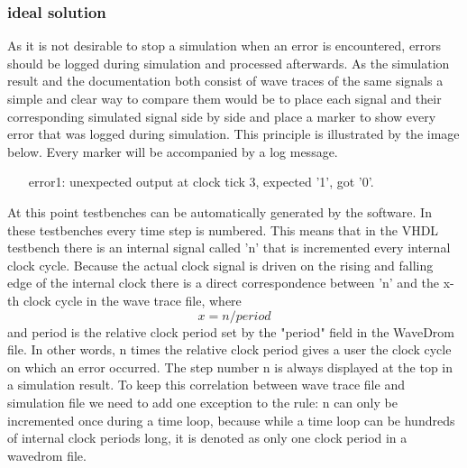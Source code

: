 \subsubsection{ideal solution}\label{TD:ideal_solution}
As it is not desirable to stop a simulation when an error is encountered, errors should be logged during simulation and processed afterwards. As the simulation result and the documentation both consist of wave traces of the same signals a simple and clear way to compare them would be to place each signal and their corresponding simulated signal side by side and place a marker to show every error that was logged during simulation. This principle is illustrated by the image below.
\newpage\noindent
Every marker will be accompanied by a log message.
\begin{customenv}
	\label{log:example}
	\begin{itemize}
		\centering
		\item [error1:] unexpected output at clock tick 3, expected '1', got '0'.
	\end{itemize}
\end{customenv}\nline
At this point testbenches can be automatically generated by the software. In these testbenches every time step is numbered. This means that in the VHDL testbench there is an internal signal called 'n' that is incremented every internal clock cycle. Because the actual clock signal is driven on the rising and falling edge of the internal clock there is a direct correspondence between 'n' and the x-th clock cycle in the wave trace file, where
\begin{equation}
	x = n/period
\end{equation}
and period is the relative clock period set by the "period" field in the WaveDrom file. In other words, n times the relative clock period gives a user the clock cycle on which an error occurred. The step number n is always displayed at the top in a simulation result.
\npar
To keep this correlation between wave trace file and simulation file we need to add one exception to the rule: n can only be incremented once during a time loop, because while a time loop can be hundreds of internal clock periods long, it is denoted as only one clock period in a wavedrom file.
